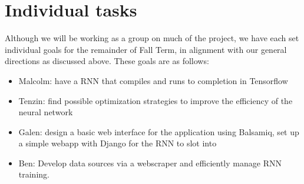 \section{Individual tasks}\label{sec:indiv}
Although we will be working as a group on much of the project, we have each set
individual goals for the remainder of Fall Term, in alignment with our general
directions as discussed above. These goals are as follows:
\begin{itemize}
  \item Malcolm: have a RNN that compiles and runs to completion in Tensorflow
  \item Tenzin: find possible optimization strategies to improve the efficiency
        of the neural network
  \item Galen: design a basic web interface for the application using Balsamiq,
        set up a simple webapp with Django for the RNN to slot into
  \item Ben: Develop data sources via a webscraper and efficiently manage RNN
  training.
\end{itemize}
